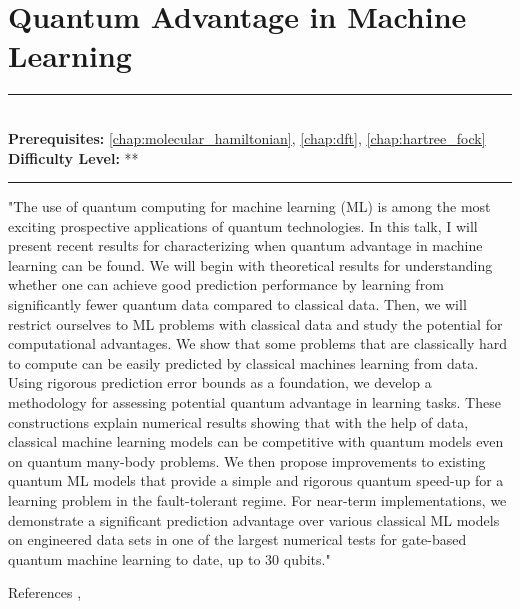 \documentclass[book.tex]{subfiles}
\begin{document}
\chapter{Quantum Advantage in Machine Learning}
\label{chap:quantum_advantage}
\noindent\rule{11cm}{0.4pt} \\
\textbf{Prerequisites:} \autoref{chap:molecular_hamiltonian}, \autoref{chap:dft}, \autoref{chap:hartree_fock} \\
\textbf{Difficulty Level:} ** \\
\noindent\rule{11cm}{0.4pt}
\vspace{5mm}

"The use of quantum computing for machine learning (ML) is among the most exciting prospective applications of quantum technologies. In this talk, I will present recent results for characterizing when quantum advantage in machine learning can be found. We will begin with theoretical results for understanding whether one can achieve good prediction performance by learning from significantly fewer quantum data compared to classical data. Then, we will restrict ourselves to ML problems with classical data and study the potential for computational advantages. We show that some problems that are classically hard to compute can be easily predicted by classical machines learning from data. Using rigorous prediction error bounds as a foundation, we develop a methodology for assessing potential quantum advantage in learning tasks. These constructions explain numerical results showing that with the help of data, classical machine learning models can be competitive with quantum models even on quantum many-body problems. We then propose improvements to existing quantum ML models that provide a simple and rigorous quantum speed-up for a learning problem in the fault-tolerant regime. For near-term implementations, we demonstrate a significant prediction advantage over various classical ML models on engineered data sets in one of the largest numerical tests for gate-based quantum machine learning to date, up to 30 qubits."

References \cite{huang2021information}, \cite{huang2021power}
\end{document}
